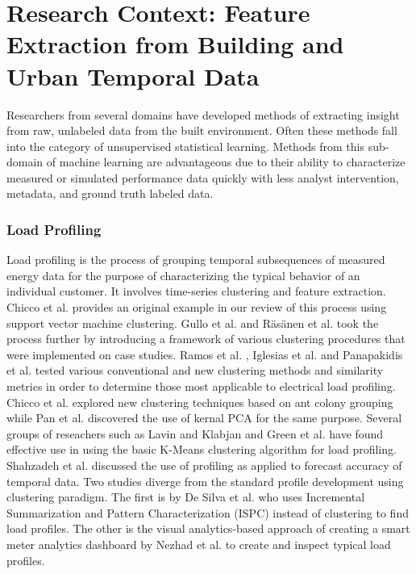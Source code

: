 \section{Research Context: Feature Extraction from Building and Urban Temporal Data}
\label{sec:litreview}

Researchers from several domains have developed methods of extracting insight from raw, unlabeled data from the built environment. Often these methods fall into the category of unsupervised statistical learning. Methods from this sub-domain of machine learning are advantageous due to their ability to characterize measured or simulated performance data quickly with less analyst intervention, metadata, and ground truth labeled data. 

\subsubsection{Load Profiling}
Load profiling is the process of grouping temporal subsequences of measured energy data for the purpose of characterizing the typical behavior of an individual customer. It involves time-series clustering and feature extraction. Chicco et al. \cite{chicco_support_2009} provides an original example in our review of this process using support vector machine clustering. Gullo et al. \cite{gullo_low-voltage_2009} and R\"as\"anen et al. \cite{rasanen_feature-based_2009} took the process further by introducing a framework of various clustering procedures that were implemented on case studies. Ramos et al. \cite{ramos_typical_2012}, Iglesias et al. \cite{iglesias_analysis_2013} and Panapakidis et al. \cite{panapakidis_evaluation_2015} tested various conventional and new clustering methods and similarity metrics in order to determine those most applicable to electrical load profiling. Chicco et al. \cite{chicco_electrical_2013} explored new clustering techniques based on ant colony grouping while Pan et al. \cite{pan_kernel-based_2015} discovered the use of kernal PCA for the same purpose. Several groups of reseachers such as Lavin and Klabjan \cite{lavin_clustering_2014} and Green et al. \cite{green_divide_2014} have found effective use in using the basic K-Means clustering algorithm for load profiling. Shahzadeh et al. \cite{shahzadeh_improving_2015} discussed the use of profiling as applied to forecast accuracy of temporal data. Two studies diverge from the standard profile development using clustering paradigm. The first is by De Silva et al. \cite{de_silva_data_2011} who uses Incremental Summarization and Pattern Characterization (ISPC) instead of clustering to find load profiles. The other is the visual analytics-based approach of creating a smart meter analytics dashboard by Nezhad et al. \cite{jarrah_nezhad_smartd:_2014} to create and inspect typical load profiles.

